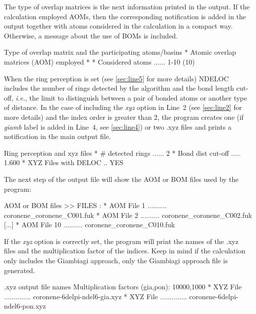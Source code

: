 \documentclass[a4paper,11pt,openany]{memoir}
\newcommand\programa{\textsc{NDELOC}}
\begin{document}
The type of overlap matrices is the next information printed in the output. If the calculation employed \acfp{AOM}, then the corresponding notification is added in the output together with atoms considered in the calculation in a compact way. Otherwise, a message about the use of \acfp{BOM} is included.
\begin{recuadro}{Type of overlap matrix and the participating atoms/basins}
* Atomic overlap matrices (AOM) employed *
* Considered atoms ...... 1-10 (10)
\end{recuadro}
When the ring perception is set (see \autoref{sec:line5} for more details) \programa~ includes the number of rings detected by the algorithm and the bond length cut-off, \emph{i.e.}, the limit to distinguish between a pair of bonded atoms or another type of distance. In the case of including the \emph{xyz} option in Line~2 (see \autoref{sec:line2} for more details) and the index order is greater than 2, the program creates one (if \emph{giamb} label is added in Line~4, see \autoref{sec:line4}) or two .xyz files and prints a notification in the main output file.
\begin{recuadro}{Ring perception and xyz files}
* # detected rings ...... 2
* Bond dist cut-off ..... 1.600
* XYZ Files with DELOC .. YES
\end{recuadro}

The next step of the output file will show the \ac{AOM} or \ac{BOM} files used by the program:
\begin{recuadro}{\ac{AOM} or \ac{BOM} files}
>> FILES   :
* AOM File   1 .......... coronene_coronene_C001.fuk
* AOM File   2 .......... coronene_coronene_C002.fuk
[...]
* AOM File  10 .......... coronene_coronene_C010.fuk
\end{recuadro}

If the \emph{xyz} option is correctly set, the program will print the names of the .xyz files and the multiplication factor of the indices. Keep in mind if the calculation only includes the Giambiagi approach, only the Giambiagi approach file is generated.
\begin{recuadro}{.xyz output file names}
Multiplication factors (gia,pon): 10000,1000
* XYZ File .............. coronene-6delpi-ndel6-gia.xyz
* XYZ File .............. coronene-6delpi-ndel6-pon.xyz
\end{recuadro}
\end{document}
